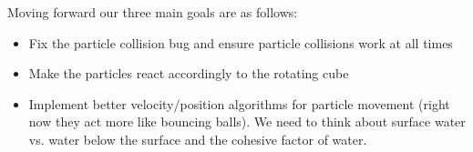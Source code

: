 Moving forward our three main goals are as follows:

\begin{itemize}
  \item{ Fix the particle collision bug and ensure particle collisions work at all times}
  \item{ Make the particles react accordingly to the rotating cube}
  \item{Implement better velocity/position algorithms for particle movement (right now they act more like bouncing balls).  We need to think about surface water vs. water below the surface and the cohesive factor of water. 
}
\end{itemize}

